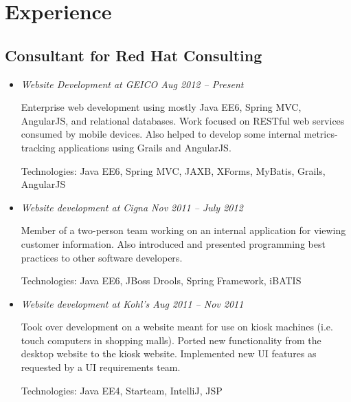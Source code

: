 \documentclass[a4paper,11pt]{article}
\begin{document}

\section*{Experience}

\subsection*{Consultant for Red Hat Consulting}

  \vskip 5pt
  \begin{itemize}

    \item \textit{Website Development at GEICO \hfill Aug 2012 -- Present}

      Enterprise web development using mostly Java EE6, Spring MVC, AngularJS,
      and relational databases. Work focused on RESTful web services consumed by
      mobile devices. Also helped to develop some internal metrics-tracking
      applications using Grails and AngularJS.

      Technologies: Java EE6, Spring MVC, JAXB, XForms, MyBatis, Grails,
      AngularJS

%

    \item \textit{Website development at Cigna \hfill Nov 2011 -- July 2012}

      Member of a two-person team working on an internal application for viewing
      customer information. Also introduced and presented programming best
      practices to other software developers.

      Technologies: Java EE6, JBoss Drools, Spring Framework, iBATIS

    \item \textit{Website development at Kohl's \hfill Aug 2011 -- Nov 2011}

      Took over development on a website meant for use on kiosk machines
      (i.e. touch computers in shopping malls). Ported new functionality from
      the desktop website to the kiosk website. Implemented new UI features as
      requested by a UI requirements team.

      Technologies: Java EE4, Starteam, IntelliJ, JSP

  \end{itemize}
\end{document}

